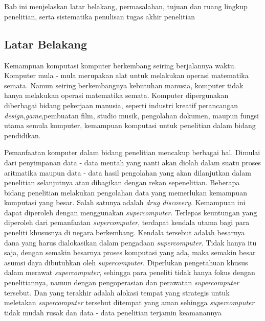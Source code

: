 
\chapter{\babSatu}
Bab ini menjelaskan latar belakang, permasalahan, tujuan dan ruang lingkup 
penelitian, serta sistematika penulisan tugas akhir penelitian 

\section{Latar Belakang}

\hspace{0.5 cm}Kemampuan komputasi komputer berkembang seiring berjalannya waktu. Komputer mula - mula merupakan alat untuk melakukan operasi matematika semata. Namun seiring berkembangnya kebutuhan manusia, komputer tidak hanya melakukan operasi matematika semata. Komputer dipergunakan diberbagai bidang pekerjaan manusia, seperti industri kreatif perancangan \textit{design},\textit{game},pembuatan film, studio musik, pengolahan dokumen, maupun fungsi utama semula komputer, kemampuan komputasi untuk penelitian dalam bidang pendidikan.

Pemanfaatan komputer dalam bidang penelitian mencakup berbagai hal. Dimulai dari penyimpanan data - data mentah yang nanti akan diolah dalam suatu proses aritmatika maupun data - data hasil pengolahan yang akan dilanjutkan dalam penelitian selanjutnya atau dibagikan dengan rekan sepenelitian. Beberapa bidang penelitian melakukan pengolahan data yang memerlukan kemampuan komputasi yang besar. Salah satunya adalah \textit{drug discovery}. Kemampuan ini dapat diperoleh dengan menggunakan \textit{supercomputer}. Terlepas keuntungan yang diperoleh dari pemanfaatan \textit{supercomputer}, terdapat kendala utama bagi para peneliti khususnya di negara berkembang. Kendala tersebut adalah besarnya dana yang harus dialokasikan dalam pengadaan \textit{supercomputer}. Tidak hanya itu saja, dengan semakin besarnya proses komputasi yang ada, maka semakin besar asumsi daya dibutuhkan oleh \textit{supercomputer}. Diperlukan pengetahuan khusus dalam merawat \textit{supercomputer}, sehingga para peneliti tidak hanya fokus dengan penelitiannya, namun dengan pengoperasian dan perawatan \textit{supercomputer} tersebut. Dan yang terakhir adalah alokasi tempat yang strategis untuk meletakan \textit{supercomputer} tersebut ditempat yang aman sehingga \textit{supercomputer} tidak mudah rusak dan data - data penelitian terjamin keamanannya 


